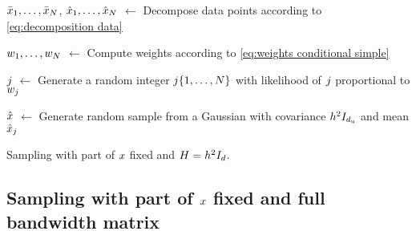 \begin{algorithm}[t]
	
	$\bar{x}_{1},\ldots,\bar{x}_{N}$, $\hat{x}_{1},\ldots,\hat{x}_{N}$ $\gets$ Decompose data points according to \cref{eq:decomposition data}
	
	$w_{1},\ldots,w_{N}$ $\gets$ Compute weights according to \cref{eq:weights conditional simple}
	
	$j$ $\gets$ Generate a random integer $j\{1,\ldots,N\}$ with likelihood of $j$ proportional to $w_{j}$
	
	$\hat{x}$ $\gets$ Generate random sample from a Gaussian with covariance $h^2 I_{d_\mathrm{u}}$ and mean $\hat{x}_{j}$
		
	\caption{Sampling with part of $x$ fixed and $H=h^2 I_{d}$.}
	\label{alg:conditional simple}
\end{algorithm}



\subsection{Sampling with part of $x$ fixed and full bandwidth matrix}
\label{sec:sampling conditional hard}

